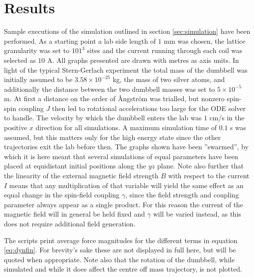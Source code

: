 \documentclass[main.tex]{subfiles}
\begin{document}
\section{Results}
Sample executions of the simulation outlined in section \ref{sec:simulation} have been
performed. As a starting point a lab side length of \(1\) mm was chosen, the lattice
granularity was set to \(101^3\) sites and the current running through each coil was
selected as \(10\) A. All graphs presented are drawn with metres as axis units. In light of the typical Stern-Gerlach experiment the total mass
of the dumbbell was initially assumed to be \(3.58\times 10^{-25}\) kg, the mass of two silver
atoms, and additionally the distance between the two dumbbell masses was set to \(5\times
10^{-5}\) m. At first a distance on the order of Ångström was trialled, but nonzero
spin-spin coupling \(J\) then led to rotational accelerations too large for the ODE solver
to handle. The velocity by which the dumbbell enters the lab was \(1\) cm/s in the positive
\(x\) direction for all simulations. A maximum simulation time of \(0.1\) s was
assumed, but this matters only for the high energy state
since the other
trajectories exit the lab before then. The graphs shown have been ''swarmed'', by which it
is here meant that several simulations of equal parameters have been placed at equidistant
initial positions along the \(yz\) plane. Note also further that the linearity of the
external magnetic field strength \(B\) with respect to the current \(I\) means that any multiplication of that
variable will yield the same effect as an equal change in the spin-field coupling
\(\gamma\), since the field strength and coupling parameter always appear as a single product. For this reason the current of the magnetic field will in general be held fixed
and \(\gamma\) will be varied instead, as this does not require additional field
generation.

The scripts print average force magnitudes for the different terms in equation
\ref{eq:dynfin}. For brevity's sake these are not displayed in full here, but will be
quoted when appropriate. Note also that the rotation of the dumbbell, while simulated and
while it does affect the centre off mass trajectory, is not plotted.
\end{document}
